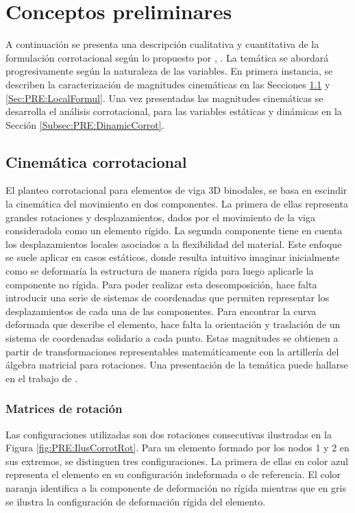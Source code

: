\chapter{Conceptos preliminares}\label{Cap:Preliminares}
\linenumbers

A continuación se presenta una descripción cualitativa y cuantitativa de la formulación corrotacional según lo propuesto por \cite{Le2014}, \citep{Battini2002}. La temática se abordará progresivamente según la naturaleza de las variables. En primera instancia, se describen la caracterización de magnitudes cinemáticas en las Secciones \ref{Subsec:PRE:CienmaticCorrot} y \ref{Sec:PRE:LocalFormul}. Una vez presentadas las magnitudes cinemáticas se desarrolla el análisis corrotacional, para las variables estáticas y dinámicas en la Sección \ref{Subsec:PRE:DinamicCorrot}.


\section{Cinemática corrotacional}\label{Subsec:PRE:CienmaticCorrot}


El planteo corrotacional para elementos de viga 3D binodales, se basa en escindir la cinemática del movimiento en dos componentes. La primera de ellas representa grandes rotaciones y desplazamientos, dados por el movimiento de la viga consideradola como un elemento rígido. La segunda componente tiene en cuenta los desplazamientos locales asociados a la flexibilidad del material. Este enfoque se suele aplicar en casos estáticos, donde resulta intuitivo imaginar inicialmente como se deformaría la estructura de manera rígida para luego aplicarle la componente no rígida. Para poder realizar esta descomposición, hace falta introducir una serie de sistemas de coordenadas que permiten representar los desplazamientos de cada una de las componentes. Para encontrar la curva deformada que describe el elemento, hace falta la orientación y traslación de un sistema de coordenadas solidario a cada punto. Estas magnitudes se obtienen a partir de transformaciones representables matemáticamente con la artillería del álgebra matricial para rotaciones. Una presentación de la temática puede hallarse en el trabajo de \cite{kovzar1995finite}.

\subsection{Matrices de rotación}

Las configuraciones utilizadas son dos rotaciones consecutivas ilustradas en la Figura \ref{fig:PRE:IlusCorrotRot}. Para un elemento formado por los nodos 1 y 2 en sus extremos, se distinguen tres configuraciones. La primera de ellas en color azul representa el elemento en su configuración indeformada o de referencia. El color naranja identifica a la componente de deformación no rígida mientras que en gris se ilustra la configuración de deformación rígida del elemento.

